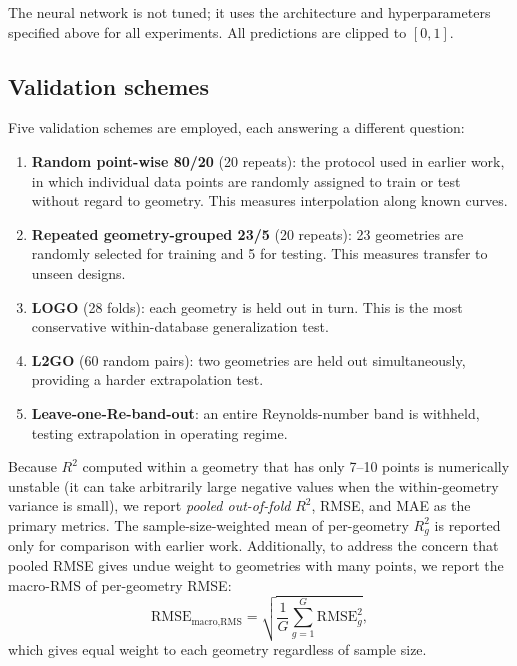 \documentclass[12pt]{article}
\begin{document}
The neural network is not tuned; it uses the architecture and hyperparameters specified above for all experiments. All predictions are clipped to $[0, 1]$.

\subsection{Validation schemes}
Five validation schemes are employed, each answering a different question:
\begin{enumerate}[label=(\alph*)]
\item \textbf{Random point-wise 80/20} (20 repeats): the protocol used in earlier work, in which individual data points are randomly assigned to train or test without regard to geometry. This measures interpolation along known curves.
\item \textbf{Repeated geometry-grouped 23/5} (20 repeats): 23 geometries are randomly selected for training and 5 for testing. This measures transfer to unseen designs.
\item \textbf{LOGO} (28 folds): each geometry is held out in turn. This is the most conservative within-database generalization test.
\item \textbf{L2GO} (60 random pairs): two geometries are held out simultaneously, providing a harder extrapolation test.
\item \textbf{Leave-one-Re-band-out}: an entire Reynolds-number band is withheld, testing extrapolation in operating regime.
\end{enumerate}
Because $R^2$ computed within a geometry that has only 7--10 points is numerically unstable (it can take arbitrarily large negative values when the within-geometry variance is small), we report \emph{pooled out-of-fold} $R^2$, RMSE, and MAE as the primary metrics. The sample-size-weighted mean of per-geometry $R^2_g$ is reported only for comparison with earlier work. Additionally, to address the concern that pooled RMSE gives undue weight to geometries with many points, we report the macro-RMS of per-geometry RMSE:
\begin{equation}
\text{RMSE}_{\text{macro,RMS}} = \sqrt{\frac{1}{G}\sum_{g=1}^{G} \text{RMSE}_g^2},
\end{equation}
which gives equal weight to each geometry regardless of sample size.
\end{document}
